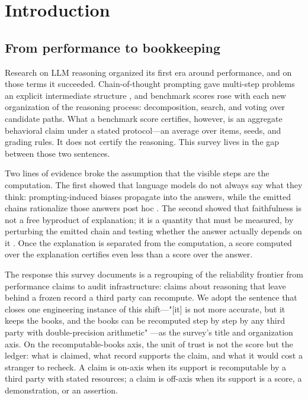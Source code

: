 \documentclass[11pt,a4paper]{article}
\begin{document}
\section{Introduction}

\subsection{From performance to bookkeeping}

Research on LLM reasoning organized its first era around performance, and on those terms it succeeded. Chain-of-thought prompting gave multi-step problems an explicit intermediate structure \cite{key01}, and benchmark scores rose with each new organization of the reasoning process: decomposition, search, and voting over candidate paths. What a benchmark score certifies, however, is an aggregate behavioral claim under a stated protocol—an average over items, seeds, and grading rules. It does not certify the reasoning. This survey lives in the gap between those two sentences.

Two lines of evidence broke the assumption that the visible steps are the computation. The first showed that language models do not always say what they think: prompting-induced biases propagate into the answers, while the emitted chains rationalize those answers post hoc \cite{key02}. The second showed that faithfulness is not a free byproduct of explanation; it is a quantity that must be measured, by perturbing the emitted chain and testing whether the answer actually depends on it \cite{key03}. Once the explanation is separated from the computation, a score computed over the explanation certifies even less than a score over the answer.

The response this survey documents is a regrouping of the reliability frontier from performance claims to audit infrastructure: claims about reasoning that leave behind a frozen record a third party can recompute. We adopt the sentence that closes one engineering instance of this shift—"[it] is not more accurate, but it keeps the books, and the books can be recomputed step by step by any third party with double-precision arithmetic" \cite{key04}—as the survey's title and organization axis. On the recomputable-books axis, the unit of trust is not the score but the ledger: what is claimed, what record supports the claim, and what it would cost a stranger to recheck. A claim is on-axis when its support is recomputable by a third party with stated resources; a claim is off-axis when its support is a score, a demonstration, or an assertion.
\end{document}

